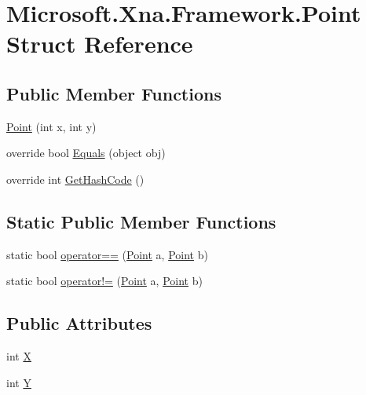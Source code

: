 \hypertarget{struct_microsoft_1_1_xna_1_1_framework_1_1_point}{}\section{Microsoft.\+Xna.\+Framework.\+Point Struct Reference}
\label{struct_microsoft_1_1_xna_1_1_framework_1_1_point}
\subsection*{Public Member Functions}
\begin{DoxyCompactItemize}
\item 
\hyperlink{struct_microsoft_1_1_xna_1_1_framework_1_1_point_a5705f9c8abe29c988b148d36b83ab2db}{Point} (int x, int y)
\item 
override bool \hyperlink{struct_microsoft_1_1_xna_1_1_framework_1_1_point_a4e9e18eea606a19f0b1786d5e0010b39}{Equals} (object obj)
\item 
override int \hyperlink{struct_microsoft_1_1_xna_1_1_framework_1_1_point_a505ba80f1f4302b17073edd37c377731}{Get\+Hash\+Code} ()
\end{DoxyCompactItemize}
\subsection*{Static Public Member Functions}
\begin{DoxyCompactItemize}
\item 
static bool \hyperlink{struct_microsoft_1_1_xna_1_1_framework_1_1_point_a39d6c294f6860ce6658dc58064df7999}{operator==} (\hyperlink{struct_microsoft_1_1_xna_1_1_framework_1_1_point}{Point} a, \hyperlink{struct_microsoft_1_1_xna_1_1_framework_1_1_point}{Point} b)
\item 
static bool \hyperlink{struct_microsoft_1_1_xna_1_1_framework_1_1_point_ae5f41cda1eaa7abaa2307b62019a1969}{operator!=} (\hyperlink{struct_microsoft_1_1_xna_1_1_framework_1_1_point}{Point} a, \hyperlink{struct_microsoft_1_1_xna_1_1_framework_1_1_point}{Point} b)
\end{DoxyCompactItemize}
\subsection*{Public Attributes}
\begin{DoxyCompactItemize}
\item 
int \hyperlink{struct_microsoft_1_1_xna_1_1_framework_1_1_point_a4684f15d61788da3ba84e5b1c14781e3}{X}
\item 
int \hyperlink{struct_microsoft_1_1_xna_1_1_framework_1_1_point_abb9c724b5024be2cb69bc8d19011d432}{Y}
\end{DoxyCompactItemize}
